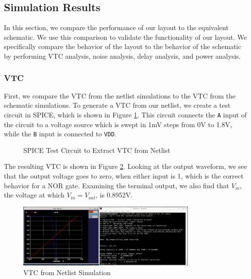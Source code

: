\documentclass{article}
\begin{document}
	\subsection{Simulation Results}
	
	In this section, we compare the performance of our layout to the equivalent schematic. We use this comparison to validate the functionality of our layout. We specifically compare the behavior of the layout to the behavior of the schematic by performing VTC analysis, noise analysis, delay analysis, and power analysis.
	
	\subsubsection{VTC}
	
	First, we compare the VTC from the netlist simulations to the VTC from the schematic simulations. To generate a VTC from our netlist, we create a test circuit in SPICE, which is shown in Figure \ref{fig::nor_vtc_test_circuit}. This circuit connects the \texttt{A} input of the circuit to a voltage source which is swept in 1mV steps from 0V to 1.8V, while the \texttt{B} input is connected to \texttt{VDD}.
	
	\begin{figure}[H]
		
		\caption{SPICE Test Circuit to Extract VTC from Netlist}
		\label{fig::nor_vtc_test_circuit}
	\end{figure}
	
	The resulting VTC is shown in Figure \ref{fig::nor_vtc}. Looking at the output waveform, we see that the output voltage goes to zero, when either input is 1, which is the correct behavior for a NOR gate. Examining the terminal output, we also find that $V_m$, the voltage at which $V_{in} = V_{out}$, is 0.8952V.
	
	\begin{figure}[H]
		\centerline{\includegraphics[width=0.8\textwidth]{nor_vtc.png}}
		\caption{VTC from Netlist Simulation}
		\label{fig::nor_vtc}
	\end{figure}
	
\end{document}
